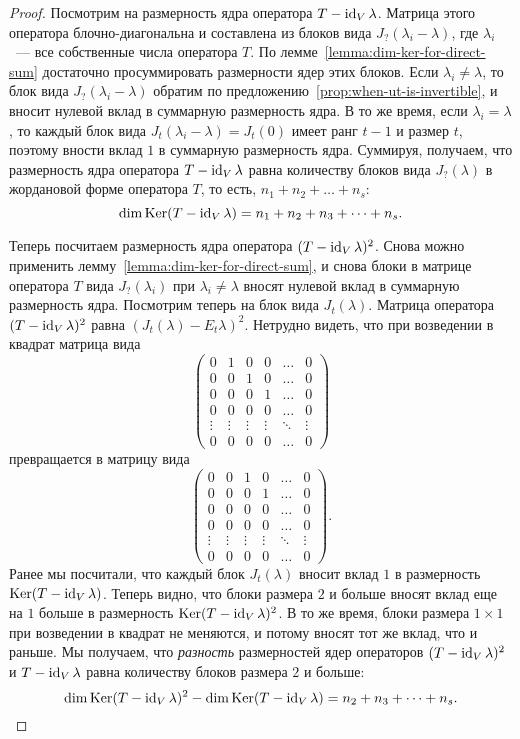\begin{proof}
Посмотрим на размерность ядра оператора $T-\operatorname{id}_V\lambda$.
Матрица этого оператора блочно-диагональна и составлена
из блоков вида $J_?(\lambda_i-\lambda)$, где $\lambda_i$~---
все собственные числа оператора $T$.
По лемме~\ref{lemma:dim-ker-for-direct-sum}
достаточно просуммировать размерности ядер этих блоков.
Если $\lambda_i\neq\lambda$, то блок вида
$J_?(\lambda_i-\lambda)$ обратим
по предложению~\ref{prop:when-ut-is-invertible},
и вносит нулевой вклад в суммарную размерность ядра.
В то же время, если $\lambda_i = \lambda$, то каждый
блок вида $J_t(\lambda_i-\lambda) = J_t(0)$ имеет ранг $t-1$
и размер $t$, поэтому вности вклад $1$ в суммарную размерность ядра.
Суммируя, получаем, что размерность ядра оператора
$T-\operatorname{id}_V\lambda$ равна количеству блоков вида $J_?(\lambda)$
в жордановой форме оператора $T$, то есть, $n_1+n_2+\dots+n_s$:
$$
\dim\operatorname{Ker}(T-\operatorname{id}_V\lambda) = n_1 + n_2 + n_3 + \dots + n_s.
$$

Теперь посчитаем размерность ядра оператора
$(T-\operatorname{id}_V\lambda)^2$. Снова можно
применить лемму~\ref{lemma:dim-ker-for-direct-sum},
и снова блоки в матрице оператора $T$ вида $J_?(\lambda_i)$
при $\lambda_i\neq\lambda$ вносят нулевой вклад в суммарную размерность
ядра. Посмотрим теперь на блок вида $J_t(\lambda)$.
Матрица оператора $(T-\operatorname{id}_V\lambda)^2$ равна
$(J_t(\lambda) - E_t\lambda)^2$. Нетрудно видеть,
что при возведении в квадрат матрица вида
$$
\begin{pmatrix}
0 & 1 & 0 & 0 & \dots & 0 \\
0 & 0 & 1 & 0 & \dots & 0 \\
0 & 0 & 0 & 1 & \dots & 0 \\
0 & 0 & 0 & 0 & \dots & 0 \\
\vdots & \vdots & \vdots & \vdots & \ddots & \vdots \\
0 & 0 & 0 & 0 & \dots & 0
\end{pmatrix}
$$
превращается в матрицу вида
$$
\begin{pmatrix}
0 & 0 & 1 & 0 & \dots & 0 \\
0 & 0 & 0 & 1 & \dots & 0 \\
0 & 0 & 0 & 0 & \dots & 0 \\
0 & 0 & 0 & 0 & \dots & 0 \\
\vdots & \vdots & \vdots & \vdots & \ddots & \vdots \\
0 & 0 & 0 & 0 & \dots & 0
\end{pmatrix}.
$$
Ранее мы посчитали, что каждый блок $J_t(\lambda)$ вносит вклад
$1$ в размерность $\operatorname{Ker}(T-\operatorname{id}_V\lambda)$. Теперь видно,
что блоки размера $2$ и больше вносят вклад еще на $1$ больше
в размерность $\operatorname{Ker}(T-\operatorname{id}_V\lambda)^2$. В то же время, блоки
размера $1\times 1$ при возведении в квадрат не меняются,
и потому вносят тот же вклад, что и раньше.
Мы получаем, что {\em разность} размерностей ядер
операторов $(T-\operatorname{id}_V\lambda)^2$ и $T-\operatorname{id}_V\lambda$
равна количеству блоков размера $2$ и больше:
$$
\dim\operatorname{Ker}(T-\operatorname{id}_V\lambda)^2 - \dim\operatorname{Ker}(T-\operatorname{id}_V\lambda) = n_2 + n_3 + \dots + n_s.
$$


\end{proof}

